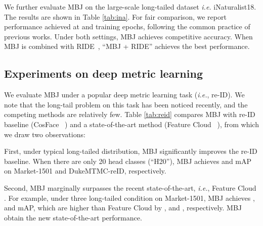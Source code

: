 \documentclass[final]{cvpr}
\def\ie{\textit{i.e.}}
\begin{document}
We further evaluate MBJ on the large-scale long-tailed dataset \emph{i.e.} iNaturalist18. The results are shown in Table \ref{tab:ina}. For fair comparison, we report performance achieved at  and  training epochs, following the common practice of previous works. Under both settings, MBJ achieves competitive accuracy. When MBJ is combined with RIDE~\cite{wang2020long}, ``MBJ + RIDE'' achieves the best performance.

\subsection{Experiments on deep metric learning}\label{sec:retrieve_exp}
We evaluate MBJ under a popular deep metric learning task (\ie, re-ID). We note that the long-tail problem on this task has been noticed recently, and the competing methods are relatively few. Table \ref{tab:reid} compares MBJ with re-ID baseline (CosFace ~\cite{wang2018cosface}) and a state-of-the-art method (Feature Cloud ~\cite{featurecloud}), from which we draw two observations:

First, under typical long-tailed distribution, MBJ significantly improves the re-ID baseline. When there are only 20 head classes (``H20''), MBJ achieves  and  mAP on Market-1501 and DukeMTMC-reID, respectively. 

Second, MBJ marginally surpasses the recent state-of-the-art, \ie, Feature Cloud \cite{featurecloud}. For example, under three long-tailed condition on Market-1501, MBJ achieves ,  and  mAP, which are higher than Feature Cloud by  ,  and , respectively. MBJ obtain the new state-of-the-art performance.
\end{document}
